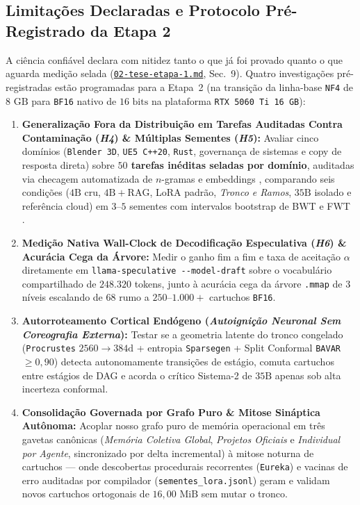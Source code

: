 \documentclass[10pt,a4paper]{article}
\begin{document}
\subsection{Limita\c{c}\~oes Declaradas e Protocolo Pr\'e-Registrado da Etapa 2}

A ci\^encia confi\'avel declara com nitidez tanto o que j\'a foi provado quanto o que aguarda medi\c{c}\~ao selada (\href{https://drive.google.com/file/d/1qvnH-nLVMc43T-prWSRTKEDJak89TSp7/view?usp=drivesdk}{\texttt{02-tese-\allowbreak{}etapa-1.md}}, Sec.~9). Quatro investiga\c{c}\~oes pr\'e-registradas est\~ao programadas para a Etapa~2 (na transi\c{c}\~ao da linha-base \texttt{NF4} de $8\text{ GB}$ para \texttt{BF16} nativo de $16\text{ bits}$ na plataforma \texttt{RTX 5060 Ti 16 GB}):
\begin{enumerate}
  \item \textbf{Generaliza\c{c}\~ao Fora da Distribui\c{c}\~ao em Tarefas Auditadas Contra Contamina\c{c}\~ao (\textit{H4}) \& M\'ultiplas Sementes (\textit{H5}):} Avaliar cinco dom\'inios (\texttt{Blender 3D}, \texttt{UE5 C++20}, \texttt{Rust}, governan\c{c}a de sistemas e copy de resposta direta) sobre \textbf{$50$ tarefas inéditas seladas por dom\'inio}, auditadas via checagem automatizada de $n$-gramas e embeddings \cite{golchin2024contamination}, comparando seis condi\c{c}\~oes ($4\text{B}$ cru, $4\text{B}+\text{RAG}$, LoRA padr\~ao, \textit{Tronco e Ramos}, $35\text{B}$ isolado e refer\^encia cloud) em $3\text{--}5$ sementes com intervalos bootstrap de BWT e FWT \cite{lopezpaz2017gem,chaudhry2018rwalk}.
  \item \textbf{Medi\c{c}\~ao Nativa Wall-Clock de Decodifica\c{c}\~ao Especulativa (\textit{H6}) \& Acur\'acia Cega da \'Arvore:} Medir o ganho fim a fim e taxa de aceita\c{c}\~ao $\alpha$ diretamente em \texttt{llama-speculative -{}-model-draft} sobre o vocabul\'ario compartilhado de $248.320$ tokens, junto \`a acur\'acia cega da \'arvore \texttt{.mmap} de 3 n\'iveis escalando de $68$ rumo a $250\text{--}1.000+$ cartuchos \texttt{BF16}.
  \item \textbf{Autorroteamento Cortical End\'ogeno (\textit{Autoigni\c{c}\~ao Neuronal Sem Coreografia Externa}):} Testar se a geometria latente do tronco congelado (\texttt{Procrustes} $2560\to 384\text{d}$ + entropia \texttt{Sparsegen} + Split Conformal \texttt{BAVAR} $\ge 0,90$) detecta autonomamente transi\c{c}\~oes de est\'agio, comuta cartuchos entre est\'agios de DAG e acorda o cr\'itico Sistema-2 de $35\text{B}$ apenas sob alta incerteza conformal.
  \item \textbf{Consolida\c{c}\~ao Governada por Grafo Puro \& Mitose Sin\'aptica Aut\^onoma:} Acoplar nosso grafo puro de mem\'oria operacional em tr\^es gavetas can\^onicas (\textit{Mem\'oria Coletiva Global}, \textit{Projetos Oficiais} e \textit{Individual por Agente}, sincronizado por delta incremental) \`a mitose noturna de cartuchos --- onde descobertas procedurais recorrentes (\texttt{Eureka}) e vacinas de erro auditadas por compilador (\texttt{sementes\_\allowbreak{}lora.jsonl}) geram e validam novos cartuchos ortogonais de $16,00\text{ MiB}$ sem mutar o tronco.
\end{enumerate}
\end{document}
